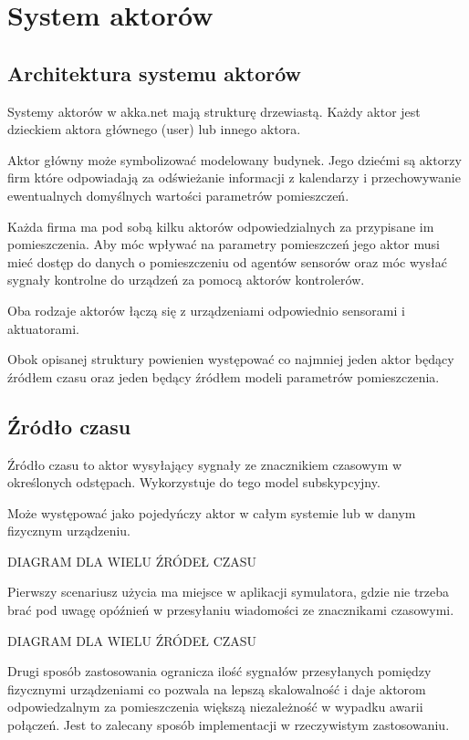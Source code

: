 \chapter{System aktorów}\label{ch:aktorzy}
\section{Architektura systemu aktorów}
Systemy aktorów w akka.net mają strukturę drzewiastą. 
Każdy aktor jest dzieckiem aktora głównego (user) lub innego aktora. 



Aktor główny może symbolizować modelowany budynek.
Jego dziećmi są aktorzy firm które odpowiadają za odświeżanie informacji z kalendarzy i przechowywanie ewentualnych domyślnych wartości parametrów pomieszczeń.

Każda firma ma pod sobą kilku aktorów odpowiedzialnych za przypisane im pomieszczenia.
Aby móc wpływać na parametry pomieszczeń jego aktor musi mieć dostęp do danych o pomieszczeniu od agentów sensorów oraz móc wysłać sygnały kontrolne do urządzeń za pomocą aktorów kontrolerów.

Oba rodzaje aktorów łączą się z urządzeniami odpowiednio sensorami i aktuatorami.

Obok opisanej struktury powienien występować co najmniej jeden aktor będący źródłem czasu oraz jeden będący źródłem modeli parametrów pomieszczenia.

\section{Źródło czasu}
Źródło czasu to aktor wysyłający sygnały ze znacznikiem czasowym w określonych odstępach. Wykorzystuje do tego model subskypcyjny.

Może występować jako pojedyńczy aktor w całym systemie lub w danym fizycznym urządzeniu. 

DIAGRAM DLA WIELU ŹRÓDEŁ CZASU
% 

Pierwszy scenariusz użycia ma miejsce w aplikacji symulatora, gdzie nie trzeba brać pod uwagę opóźnień w przesyłaniu wiadomości ze znacznikami czasowymi.

DIAGRAM DLA WIELU ŹRÓDEŁ CZASU
% 

Drugi sposób zastosowania ogranicza ilość sygnałów przesyłanych pomiędzy fizycznymi urządzeniami co pozwala na lepszą skalowalność i daje aktorom odpowiedzalnym za pomieszczenia większą niezależność w wypadku awarii połączeń.
Jest to zalecany sposób implementacji w rzeczywistym zastosowaniu.

